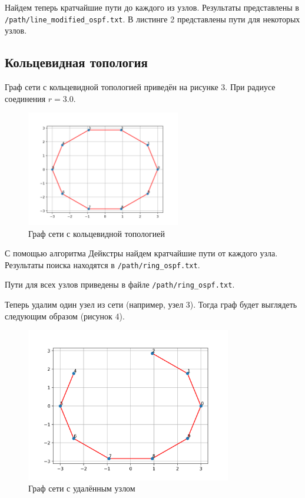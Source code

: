 \documentclass[a4paper,14pt]{extarticle}
\begin{document}
Найдем теперь кратчайшие пути до каждого из узлов. Результаты представлены в \texttt{/path/line\_modified\_ospf.txt}. В листинге 2 представлены пути для некоторых узлов.



\subsection{Кольцевидная топология}
Граф сети с кольцевидной топологией приведён на рисунке 3. При радиусе соединения $r=3.0$.

\begin{figure}[htbp]
    \centering
    \includegraphics[width=0.6\textwidth]{img/ring_graph.png}
    \caption{Граф сети с кольцевидной топологией}
    \label{fig:hamiltonianGraph}
\end{figure}

С помощью алгоритма Дейкстры найдем кратчайшие пути от каждого узла. Результаты поиска находятся в \texttt{/path/ring\_ospf.txt}.



Пути для всех узлов приведены в файле \texttt{/path/ring\_ospf.txt}.

Теперь удалим один узел из сети (например, узел 3). Тогда граф будет выглядеть следующим образом (рисунок 4).

\clearpage
\begin{figure}[htbp]
    \centering
    \includegraphics[width=0.8\textwidth]{img/ring_modified.png}
    \caption{Граф сети с удалённым узлом}
    \label{fig:hamiltonianGraph}
\end{figure}
\end{document}
